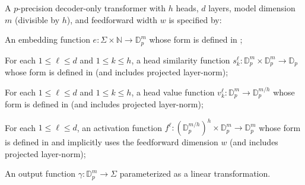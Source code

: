 \documentclass{article} %
\newcommand\change[1]{{\color{blue} #1}}
\renewcommand\change[1]{#1}
\newcommand\changeC[1]{{\color{teal} #1}}
\renewcommand\changeC[1]{#1}
\begin{document}
\begin{definition}
A $p$-precision decoder-only transformer with $h$ heads, $d$ layers, model dimension $m$ (divisible by $h$), and feedforward width $w$ is specified by:
\begin{compactenum}
    \item An embedding function $e : \Sigma \times \mathbb N \to \mathbb D_p^m$ whose form is defined in ;
    \item For each $1 \leq \ell \leq d$ and $1 \leq k \leq h$, a head similarity function $s^\ell_k : \mathbb D_p^m \times \mathbb D_p^m \to \mathbb D_p$ whose form is defined in  \change{(and includes \changeC{projected} layer-norm)};
    \item For each $1 \leq \ell \leq d$ and $1 \leq k \leq h$, a head value function $v^{\ell}_k : \mathbb D_p^m \to \mathbb D_p^{m/h}$ whose form is defined in  \change{(and includes \changeC{projected} layer-norm)};
    \item For each $1 \leq \ell \leq d$, an activation function $f^\ell : (\mathbb D_p^{m/h})^h \times \mathbb D_p^m \to \mathbb D_p^m$ whose form is defined in  and implicitly uses the feedforward dimension $w$ \change{(and includes \changeC{projected} layer-norm)};
    \item An output function $\gamma : \mathbb D_p^m \to \Sigma$ parameterized as a linear transformation.
\end{compactenum}
\end{definition}
\end{document}
